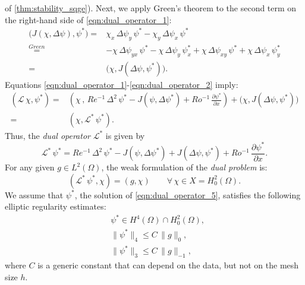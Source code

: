 of \autoref{thm:stability_sqge}).
Next, we apply Green's theorem to the second term on the right-hand side of
\eqref{eqn:dual_operator_1}:
\begin{align}
  \biggl( J(\chi , \Delta \psi) , \psi^* \biggr) =& \chi_x \, \Delta \psi_y \, \psi^*
     - \chi_y \, \Delta \psi_x \, \psi^* \nonumber \\
  \stackrel{Green}{=}& - \chi \, \Delta \psi_{y x} \, \psi^* - \chi \, \Delta
    \psi_y \, \psi^*_x + \chi \, \Delta \psi_{x y} \, \psi^* + \chi \, \Delta
    \psi_x \, \psi^*_y \nonumber \\
  =& \biggl( \chi , J(\Delta \psi , \psi^*) \biggr) .
  \label{eqn:dual_operator_2}
\end{align}
Equations \eqref{eqn:dual_operator_1}-\eqref{eqn:dual_operator_2} imply:
\begin{align}
  (\mathcal{L} \, \chi , \psi^*) =& \left( \chi \, , \, Re^{-1} \, \Delta^2 \, \psi^*
    - J(\psi , \Delta \psi^* ) + Ro^{-1} \, \frac{\partial \psi^*}{\partial x} \right)
    + \biggl( \chi , J(\Delta \psi , \psi^*) \biggr) \nonumber \\
  =& ( \chi , \mathcal{L}^* \, \psi^*) .
  \label{eqn:dual_operator_3}
\end{align}
Thus, the \emph{dual operator} $\mathcal{L}^*$ is given by
\begin{equation}
  \mathcal{L}^* \, \psi^* = Re^{-1} \, \Delta^2 \, \psi^* - J(\psi , \Delta \psi^* )
    + J(\Delta \psi , \psi^* ) + Ro^{-1} \, \frac{\partial \psi^*}{\partial x} .
  \label{eqn:dual_operator_4}
\end{equation}
For any given $g \in L^2(\Omega)$, the weak formulation of the \emph{dual
problem} is:
\begin{equation}
  ( \mathcal{L}^* \, \psi^* , \chi ) = (g , \chi)
    \qquad \forall \, \chi \in X = H_0^2(\Omega) .
  \label{eqn:dual_operator_5}
\end{equation}
We assume that $\psi^*$, the solution of \eqref{eqn:dual_operator_5}, satisfies
the following elliptic regularity estimates:
\begin{align}
  & \psi^* \in H^4(\Omega) \cap H^2_0(\Omega), \label{eqn:dual_operator_6a} \\[0.2cm]
  & \| \psi^* \|_4 \le C \, \|g\|_{0}, \label{eqn:dual_operator_6b} \\[0.2cm]
  & \| \psi^* \|_3 \le C \, \|g\|_{-1}, \label{eqn:dual_operator_6c}
\end{align}
where $C$ is a generic constant that can depend on the data, but not on the
mesh size $h$.
